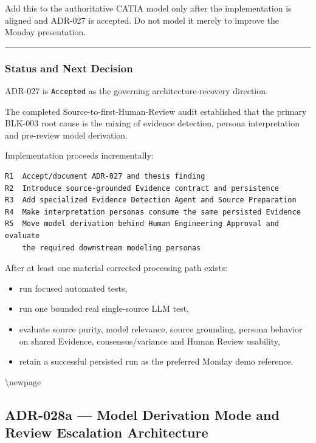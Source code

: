 Add this to the authoritative CATIA model only after the implementation is aligned and ADR-027 is accepted. Do not model it merely to improve the Monday presentation.

\begin{center}\rule{0.5\linewidth}{0.5pt}\end{center}

\hypertarget{status-and-next-decision}{%
\subsubsection{Status and Next Decision}\label{status-and-next-decision}}

ADR-027 is \texttt{Accepted} as the governing architecture-recovery direction.

The completed Source-to-first-Human-Review audit established that the primary BLK-003 root cause is the mixing of evidence detection, persona interpretation and pre-review model derivation.

Implementation proceeds incrementally:

\begin{verbatim}
R1  Accept/document ADR-027 and thesis finding
R2  Introduce source-grounded Evidence contract and persistence
R3  Add specialized Evidence Detection Agent and Source Preparation
R4  Make interpretation personas consume the same persisted Evidence
R5  Move model derivation behind Human Engineering Approval and evaluate
    the required downstream modeling personas
\end{verbatim}

After at least one material corrected processing path exists:

\begin{itemize}
\tightlist
\item
  run focused automated tests,
\item
  run one bounded real single-source LLM test,
\item
  evaluate source purity, model relevance, source grounding, persona behavior on shared Evidence, consensus/variance and Human Review usability,
\item
  retain a successful persisted run as the preferred Monday demo reference.
\end{itemize}

\textbackslash newpage

\hypertarget{adr-028a--model-derivation-mode-and-review-escalation-architecture}{%
\subsection{ADR-028a --- Model Derivation Mode and Review Escalation Architecture}\label{adr-028a--model-derivation-mode-and-review-escalation-architecture}}

